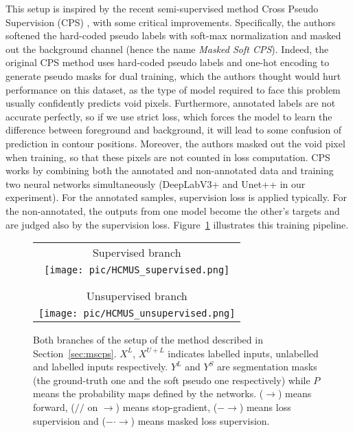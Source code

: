 \documentclass[twocolumn]{article}
\begin{document}
This setup is inspired by the recent semi-supervised method Cross Pseudo Supervision (CPS) \cite{chen2021-CPS}, with some critical improvements. Specifically, the authors softened the hard-coded pseudo labels with soft-max normalization and masked out the background channel (hence the name \emph{Masked Soft CPS}). Indeed, the original CPS method uses hard-coded pseudo labels and one-hot encoding to generate pseudo masks for dual training, which the authors thought would hurt performance on this dataset, as the type of model required to face this problem usually confidently predicts void pixels. Furthermore, annotated labels are not accurate perfectly, so if we use strict loss, which forces the model to learn the difference between foreground and background, it will lead to some confusion of prediction in contour positions. 
Moreover, the authors masked out the void pixel when training, so that these pixels are not counted in loss computation. CPS works by combining both the annotated and non-annotated data and training two neural networks simultaneously (DeepLabV3+ and Unet++ in our experiment). For the annotated samples, supervision loss is applied typically. For the non-annotated, the outputs from one model become the other's targets and are judged also by the supervision loss.
Figure~\ref{fig:HCMUS_2} illustrates this training pipeline.

\begin{figure}[t]
    \centering
    \begin{tabular}{c}
        Supervised branch\\
        \texttt{[image: pic/HCMUS\_supervised.png]}\\ \\ \\
        Unsupervised branch \\
        \texttt{[image: pic/HCMUS\_unsupervised.png]}
    \end{tabular}
    \caption{Both branches of the setup of the \HCMUS{} method described in Section~\ref{sec:mscps}. $X^L$, $X^{U+L}$ indicates labelled inputs, unlabelled and labelled inputs respectively. $Y^{L}$ and $Y^{S}$ are segmentation masks (the ground-truth one and the soft pseudo one respectively) while $P$ means the probability maps defined by the networks. ($\rightarrow$) means forward, ($//$ on $\rightarrow$) means stop-gradient, ($-\rightarrow$) means loss supervision and ($-\cdot \rightarrow$) means masked loss supervision.}
    \label{fig:HCMUS_2}
\end{figure}
\end{document}
